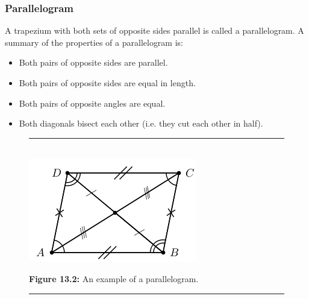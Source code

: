 \subsubsection{ Parallelogram}
A trapezium with both sets of opposite sides parallel is called a parallelogram. A summary of the properties of a parallelogram is:\par 
\begin{itemize}[noitemsep]
\item Both pairs of opposite sides are parallel.
\item Both pairs of opposite sides are equal in length.
\item Both pairs of opposite angles are equal.
\item Both diagonals bisect each other (i.e. they cut each other in half).
\end{itemize}
\setcounter{subfigure}{0}
\begin{figure}[H] %
\begin{center}
\rule[.1in]{\figurerulewidth}{.005in} \\
\label{m39354*uid61!!!underscore!!!media}\label{m39354*uid61!!!underscore!!!printimage}\includegraphics{col11306.imgs/m39354_MG10C13_041.png} %
\vspace{2pt}
\vspace{\rubberspace}\par \begin{cnxcaption}
\small \textbf{Figure 13.2: }An example of a parallelogram.
\end{cnxcaption}
\vspace{.1in}
\rule[.1in]{\figurerulewidth}{.005in} \\
\end{center}
\end{figure}       

